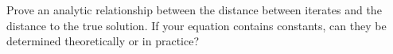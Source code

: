   Prove an analytic relationship between the distance between iterates
  and the distance to the true solution. If your equation contains
  constants, can they be determined theoretically or in practice?
